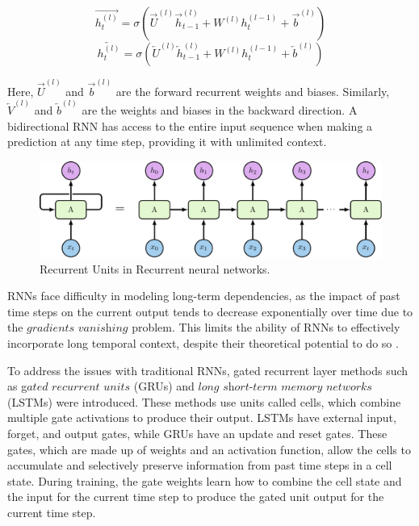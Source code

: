 \begin{equation}
    \label{eq:BiRNN1}
    \overrightarrow{h_t^{(l)}}  = \sigma (\overrightarrow{U}^{(l)} \overrightarrow{h}_{t-1}^{(l)} + W^{(l)}h_{t}^{(l-1)} + \overrightarrow{b}^{(l)})
\end{equation}
\begin{equation}
    \label{eq:BiRNN2}
        \overleftarrow{h_t^{(l)}}  = \sigma (\overleftarrow{U}^{(l)} \overleftarrow{h}_{t-1}^{(l)} + W^{(l)}h_{t}^{(l-1)} + \overleftarrow{b}^{(l)})
\end{equation}


Here, $\overrightarrow{U}^{(l)}$ and $\overrightarrow{b}^{(l)}$ are the forward recurrent weights and biases. Similarly, $\overleftarrow{V}^{(l)}$ and $\overleftarrow{b}^{(l)}$ are the weights and biases in the backward direction. A bidirectional RNN has access to the entire input sequence when making a prediction at any time step, providing it with unlimited context. 


\begin{figure}[htbp]
   \begin{center}
      \includegraphics[]{Chapitre1/figures/rnn.png}
   \end{center}
   \caption{ Recurrent Units in Recurrent neural networks.}
   \label{fig:rnn}
\end{figure}



 RNNs face difficulty in modeling long-term dependencies, as the impact of past time steps on the current output tends to decrease exponentially over time due to the $\textit{gradients vanishing}$ problem. This limits the ability of RNNs to effectively incorporate long temporal context, despite their theoretical potential to do so \cite{hochreiter2001gradient}. 

 To address the issues with traditional RNNs, gated recurrent layer methods such as g$\textit{ated recurrent units}$ (GRUs) and $\textit{long short-term memory networks}$ (LSTMs) were introduced. These methods use units called cells, which combine multiple gate activations to produce their output. LSTMs have external input, forget, and output gates, while GRUs have an update and reset gates. These gates, which are made up of weights and an activation function, allow the cells to accumulate and selectively preserve information from past time steps in a cell state. During training, the gate weights learn how to combine the cell state and the input for the current time step to produce the gated unit output for the current time step. 

